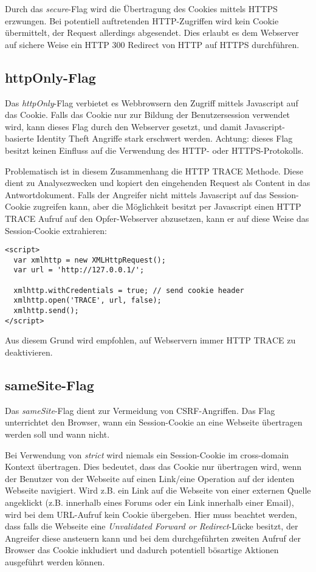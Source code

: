 Durch das \textit{secure}-Flag wird die Übertragung des Cookies mittels HTTPS erzwungen. Bei potentiell auftretenden HTTP-Zugriffen wird kein Cookie übermittelt, der Request allerdings abgesendet. Dies erlaubt es dem Webserver auf sichere Weise ein HTTP 300 Redirect von HTTP auf HTTPS durchführen.

\subsection{httpOnly-Flag}

Das \textit{httpOnly}-Flag verbietet es Webbrowsern den Zugriff mittels Javascript auf das Cookie. Falls das Cookie nur zur Bildung der Benutzersession verwendet wird, kann dieses Flag durch den Webserver gesetzt, und damit Javascript-basierte Identity Theft Angriffe stark erschwert werden. Achtung: dieses Flag besitzt keinen Einfluss auf die Verwendung des HTTP- oder HTTPS-Protokolls.

Problematisch ist in diesem Zusammenhang die HTTP TRACE Methode. Diese dient zu Analysezwecken und kopiert den eingehenden Request als Content in das Antwortdokument. Falls der Angreifer nicht mittels Javascript auf das Session-Cookie zugreifen kann, aber die Möglichkeit besitzt per Javascript einen HTTP TRACE Aufruf auf den Opfer-Webserver abzusetzen, kann er auf diese Weise das Session-Cookie extrahieren:

\begin{verbatim}
<script>
  var xmlhttp = new XMLHttpRequest();
  var url = 'http://127.0.0.1/';

  xmlhttp.withCredentials = true; // send cookie header
  xmlhttp.open('TRACE', url, false);
  xmlhttp.send();
</script>
\end{verbatim}

Aus diesem Grund wird empfohlen, auf Webservern immer HTTP TRACE zu deaktivieren.

\subsection{sameSite-Flag}
\label{session_cookies_samesite}

Das \textit{sameSite}-Flag dient zur Vermeidung von CSRF-Angriffen. Das Flag unterrichtet den Browser, wann ein Session-Cookie an eine Webseite übertragen werden soll und wann nicht.

Bei Verwendung von \textit{strict} wird niemals ein Session-Cookie im cross-domain Kontext übertragen. Dies bedeutet, dass das Cookie nur übertragen wird, wenn der Benutzer von der Webseite auf einen Link/eine Operation auf der identen Webseite navigiert. Wird z.B. ein Link auf die Webseite von einer externen Quelle angeklickt (z.B. innerhalb eines Forums oder ein Link innerhalb einer Email), wird bei dem URL-Aufruf kein Cookie übergeben. Hier muss beachtet werden, dass falls die Webseite eine \textit{Unvalidated Forward or Redirect}-Lücke besitzt, der Angreifer diese ansteuern kann und bei dem durchgeführten zweiten Aufruf der Browser das Cookie inkludiert und dadurch potentiell bösartige Aktionen ausgeführt werden können.

